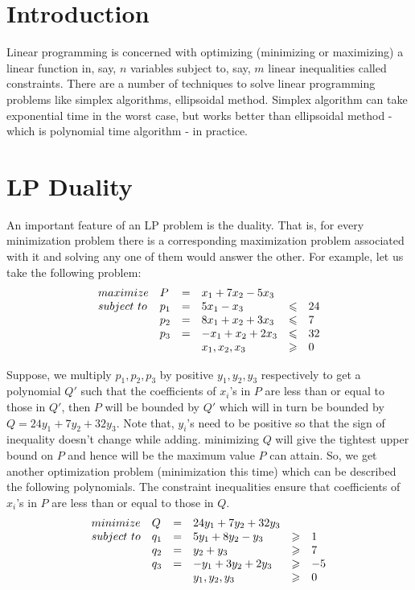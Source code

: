 
\section{Introduction}
Linear programming is concerned with optimizing (minimizing or maximizing) a linear function in, say, $n$ variables subject to, say, $m$ linear inequalities called constraints. There are a number of techniques to solve linear programming problems like simplex algorithms, ellipsoidal method. Simplex algorithm can take exponential time in the worst case, but works better than ellipsoidal method - which is polynomial time algorithm - in practice.
\section{LP Duality}
An important feature of an LP problem is the duality. That is, for every minimization problem there is a corresponding maximization problem associated with it and solving any one of them would answer the other. For example, let us take the following problem:
\[
\begin{array}{l l c l c l}
maximize & P  & = & x_1 + 7x_2 - 5x_3 &  & \\
subject \,\, to & p_1 & = & 5x_1 - x_3  & \leqslant & 24\\
		 & p_2 &=& 8x_1 + x_2 + 3x_3 & \leqslant & 7 \\
		 & p_3 &=& -x_1 + x_2 + 2x_3 & \leqslant & 32 \\
		 & & & x_1,x_2,x_3 & \geqslant & 0
\end{array} 
\]

Suppose, we multiply $p_1,p_2,p_3$ by positive $y_1,y_2,y_3$ respectively to get a polynomial $Q'$ such that the coefficients of $x_i$'s in $P$ are less than or equal to those in $Q'$, then $P$ will be bounded by $Q'$ which will in turn be bounded by $Q = 24y_1 + 7y_2 + 32y_3$. Note that, $y_i$'s need to be positive so that the sign of inequality doesn't change while adding. minimizing $Q$ will give the tightest upper bound on $P$ and hence will be the maximum value $P$ can attain. So, we get another optimization problem (minimization this time) which can be described the following polynomials. The constraint inequalities ensure that coefficients of $x_i$'s in $P$ are less than or equal to those in $Q$.
\[
\begin{array}{l l c l c l}
minimize & Q  & = & 24y_1 + 7y_2 + 32y_3 &  & \\
subject \,\, to & q_1 & = & 5y_1 + 8y_2 - y_3  & \geqslant & 1\\
		 & q_2 &=& y_2 + y_3 & \geqslant & 7 \\
		 & q_3 &=& -y_1 + 3y_2 + 2y_3 & \geqslant & -5 \\
		 & & & y_1,y_2,y_3 & \geqslant & 0
\end{array} 
\]

